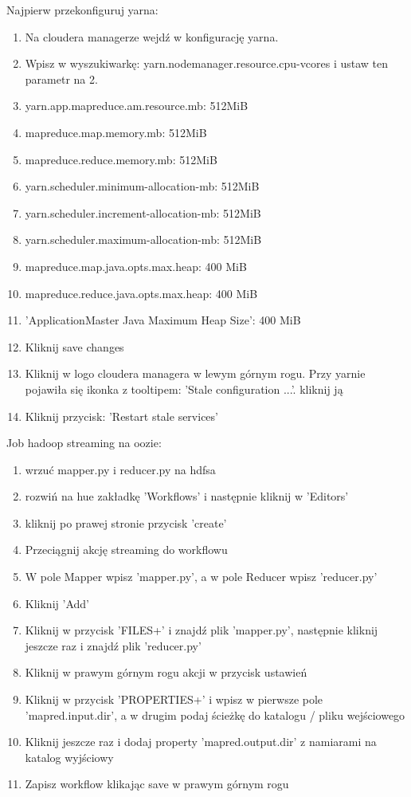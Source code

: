 \documentclass[11pt]{article}
\begin{document}
Najpierw przekonfiguruj yarna:
\begin{enumerate}
\item Na cloudera managerze wejdź w konfigurację yarna.
\item Wpisz w wyszukiwarkę: yarn.nodemanager.resource.cpu-vcores i ustaw ten parametr na 2.
\item yarn.app.mapreduce.am.resource.mb: 512MiB
\item mapreduce.map.memory.mb: 512MiB
\item mapreduce.reduce.memory.mb: 512MiB
\item yarn.scheduler.minimum-allocation-mb: 512MiB
\item yarn.scheduler.increment-allocation-mb: 512MiB
\item yarn.scheduler.maximum-allocation-mb: 512MiB
\item mapreduce.map.java.opts.max.heap: 400 MiB
\item mapreduce.reduce.java.opts.max.heap: 400 MiB
\item 'ApplicationMaster Java Maximum Heap Size': 400 MiB
\item Kliknij save changes
\item Kliknij w logo cloudera managera w lewym górnym rogu. Przy yarnie pojawiła się ikonka z tooltipem: 'Stale configuration ...'. kliknij ją
\item Kliknij przycisk: 'Restart stale services'
\end{enumerate}

\pagebreak

Job hadoop streaming na oozie:
\begin{enumerate}
\item wrzuć mapper.py i reducer.py na hdfsa
\item rozwiń na hue zakładkę 'Workflows' i następnie kliknij w 'Editors'
\item kliknij po prawej stronie przycisk 'create'
\item Przeciągnij akcję streaming do workflowu
\item W pole Mapper wpisz 'mapper.py', a w pole Reducer wpisz 'reducer.py'
\item Kliknij 'Add'
\item Kliknij w przycisk 'FILES+' i znajdź plik 'mapper.py', następnie kliknij jeszcze raz i znajdź plik 'reducer.py'
\item Kliknij w prawym górnym rogu akcji w przycisk ustawień
\item Kliknij w przycisk 'PROPERTIES+' i wpisz w pierwsze pole 'mapred.input.dir', a w drugim podaj ścieżkę do katalogu / pliku wejściowego
\item Kliknij jeszcze raz i dodaj property 'mapred.output.dir' z namiarami na katalog wyjściowy
\item Zapisz workflow klikając save w prawym górnym rogu
\end{enumerate}
\end{document}
